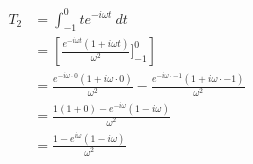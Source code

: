 \documentclass[preview]{standalone}
\begin{document}
\begin{align*}
T_{2} &=\int_{-1}^{0}t e^{-i\omega t} \ dt \\ &=\left[\frac{e^{-i\omega t}(1+i\omega t)}{\omega^{2}}]_{-1}^{0}\right] \\ &=\frac{e^{-i\omega\cdot 0}(1+i\omega\cdot 0)}{\omega^{2}}-\frac{e^{-i\omega\cdot -1}(1+i\omega\cdot -1)}{\omega^{2}} \\ &=\frac{1(1+0)-e^{-i\omega}(1-i\omega)}{\omega^{2}} \\ &= \frac{1-e^{i\omega}(1-i\omega)}{\omega^{2}}
\end{align*}
\end{document}
